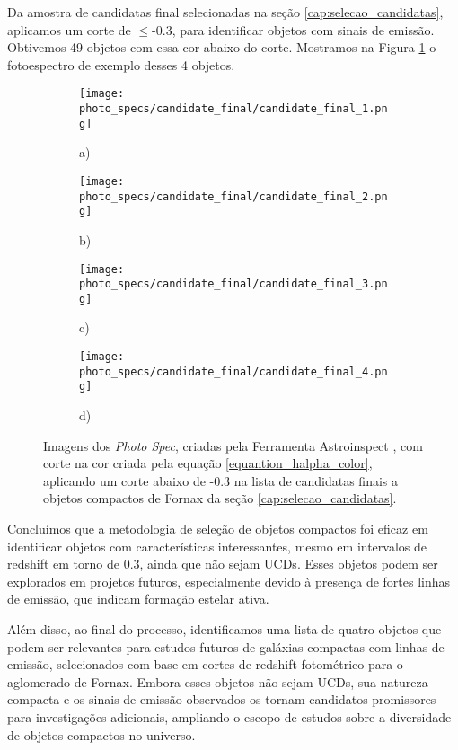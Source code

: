 Da amostra de candidatas final selecionadas na seção \ref{cap:selecao_candidatas}, aplicamos um corte de $\leq$-0.3, para identificar objetos com sinais de emissão. Obtivemos 49 objetos com essa cor abaixo do corte. Mostramos na Figura \ref{halpha_candidatas_final} o fotoespectro de exemplo desses 4 objetos.

\begin{figure}[!ht]
    \centering
    \captionsetup{justification=centering}
    \begin{subfigure}[b]{0.45\textwidth}
        \texttt{[image: photo\_specs/candidate\_final/candidate\_final\_1.png]}
        \caption{a)}
    \end{subfigure}
    \begin{subfigure}[b]{0.45\textwidth}
        \texttt{[image: photo\_specs/candidate\_final/candidate\_final\_2.png]}
        \caption{b)}
    \end{subfigure}
    \begin{subfigure}[b]{0.45\textwidth}
        \texttt{[image: photo\_specs/candidate\_final/candidate\_final\_3.png]}
        \caption{c)}
    \end{subfigure}
    \begin{subfigure}[b]{0.45\textwidth}
        \texttt{[image: photo\_specs/candidate\_final/candidate\_final\_4.png]}
        \caption{d)}
    \end{subfigure}
    \caption{Imagens dos \textit{Photo Spec}, criadas pela Ferramenta Astroinspect \cite{astroinspect}, com corte na cor criada pela equação \ref{equantion_halpha_color}, aplicando um corte abaixo de -0.3 na lista de candidatas finais a objetos compactos de Fornax da seção \ref{cap:selecao_candidatas}.}
    \label{halpha_candidatas_final}
\end{figure}

Concluímos que a metodologia de seleção de objetos compactos foi eficaz em identificar objetos com características interessantes, mesmo em intervalos de redshift em torno de 0.3, ainda que não sejam UCDs. Esses objetos podem ser explorados em projetos futuros, especialmente devido à presença de fortes linhas de emissão, que indicam formação estelar ativa.

Além disso, ao final do processo, identificamos uma lista de quatro objetos que podem ser relevantes para estudos futuros de galáxias compactas com linhas de emissão, selecionados com base em cortes de redshift fotométrico para o aglomerado de Fornax. Embora esses objetos não sejam UCDs, sua natureza compacta e os sinais de emissão observados os tornam candidatos promissores para investigações adicionais, ampliando o escopo de estudos sobre a diversidade de objetos compactos no universo.



